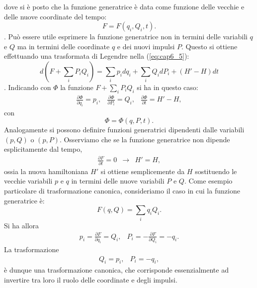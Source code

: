 dove si \`e posto che la funzione generatrice \`e data come funzione delle vecchie e delle nuove coordinate del tempo:
\begin{equation}
F = F(q_i, Q_i,t) .
\end{equation}.
Pu\`o essere utile esprimere la funzione generatrice non in termini delle variabili $q$ e $Q$ ma in termini delle coordinate $q$ e dei nuovi impulsi $P$. Questo si ottiene effettuando una trasformata di Legendre nella (\ref{eq:cap6_5}):
\begin{equation}
d(F+\sum_i P_iQ_i) = \sum_i p_i dq_i + \sum_i Q_i dP_i + (H'-H)dt
\end{equation}.
Indicando con $\Phi$ la funzione $F+\sum_iP_i Q_i $ si ha in questo caso:
\begin{equation}
\begin{matrix}
\frac{\partial \Phi}{\partial q_i} = p_i , & \frac{\partial \Phi}{\partial P_i} = Q_i , & \frac{\partial \Phi}{\partial t} = H'- H ,
\end{matrix}
\label{eq:cap6_6}
\end{equation}
con
\begin{equation}
\Phi = \Phi (q,P,t) .
\end{equation}
Analogamente si possono definire funzioni generatrici dipendenti dalle variabili $(p,Q)$ o $(p,P)$.
Osserviamo che se la funzione generatrice non dipende esplicitamente dal tempo,
\begin{equation}
\begin{matrix}
\frac{\partial F}{\partial t} = 0 & \rightarrow & H' = H ,
\end{matrix}
\end{equation}
ossia la nuova hamiltoniana $H'$ si ottiene semplicemente da $H$ sostituendo le vecchie variabili $p$ e $q$ in termini delle nuove variabili $P$ e $Q$.
Come esempio particolare di trasformazione canonica, consideriamo il caso in cui la funzione generatrice \`e:
\begin{equation}
F(q,Q) = \sum_i q_i Q_i .
\end{equation}
Si ha allora
\begin{equation}
\begin{matrix}
p_i = \frac{\partial F}{\partial q_i} = Q_i , & P_i = - \frac{\partial F}{\partial Q_i} = -q_i .
\end{matrix}
\end{equation}
La trasformazione
\begin{equation}
\begin{matrix}
Q_i = p_i  , & P_i = -q_i ,
\end{matrix}
\end{equation}
\`e dunque una trasformazione canonica, che corrisponde essenzialmente ad invertire tra loro il ruolo delle coordinate e degli impulsi.
